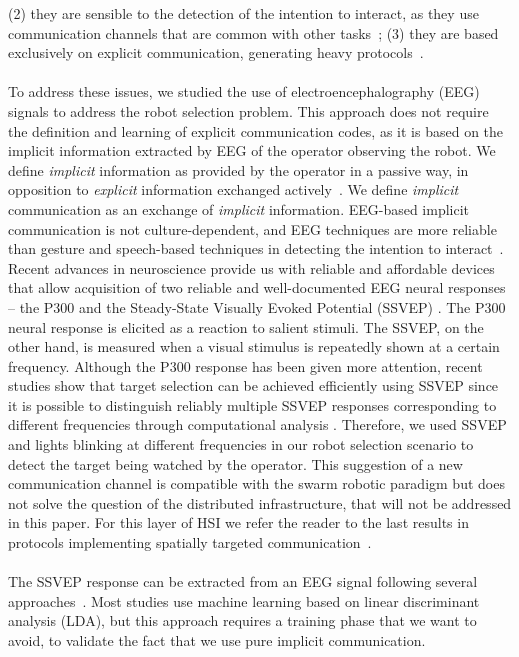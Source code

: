 \documentclass[smallextended]{svjour3}
\begin{document}
(2) they are sensible to the detection of the intention to interact, as they use communication channels that are common with other tasks~\cite{Rzepecki2012}; (3) they are based exclusively on explicit communication, generating heavy protocols~\cite{Kirchner2015}.\\
\\ 
To address these issues, we studied the use of electroencephalography (EEG) signals to address the robot selection problem. 
This approach does not require the definition and learning of explicit communication codes, as it is based on the implicit information extracted by EEG of the operator observing the robot. 
We define \textit{implicit} information as provided by the operator in a passive way, in opposition to \textit{explicit} information exchanged actively~\cite{Kirchner2015}.
We define \textit{implicit} communication as an exchange of \textit{implicit} information.
EEG-based implicit communication is not culture-dependent, and EEG techniques are more reliable than gesture and speech-based techniques in detecting the intention to interact~\cite{Rzepecki2012}.
Recent advances in neuroscience provide us with reliable and affordable devices that allow acquisition of two reliable and well-documented EEG neural responses -- the P300 and the Steady-State Visually Evoked Potential (SSVEP) \cite{Beverina2003,Bi2013,Zhu2010}. 
The P300 neural response is elicited as a reaction to salient stimuli. 
The SSVEP, on the other hand, is measured when a visual stimulus is repeatedly shown at a certain frequency. Although the P300 response has been given more attention, recent studies show that target selection can be achieved efficiently using SSVEP since it is possible to distinguish reliably multiple SSVEP responses corresponding to different frequencies through computational analysis \cite{SSVEPfiability}.
Therefore, we used SSVEP and lights blinking at different frequencies in our robot selection scenario to detect the target being watched by the operator. This suggestion of a new communication channel is compatible with the swarm robotic paradigm but does not solve the question of the distributed infrastructure, that will not be addressed in this paper. For this layer of HSI we refer the reader to the last results in protocols implementing spatially targeted communication~\cite{mathews2015spatially}.\\ 
\\ 
The SSVEP response can be extracted from an EEG signal following several approaches~\cite{Bi2013}. 
Most studies use machine learning based on linear discriminant analysis (LDA), but this approach requires a training phase that we want to avoid, to validate the fact that we use pure implicit communication.
\end{document}
